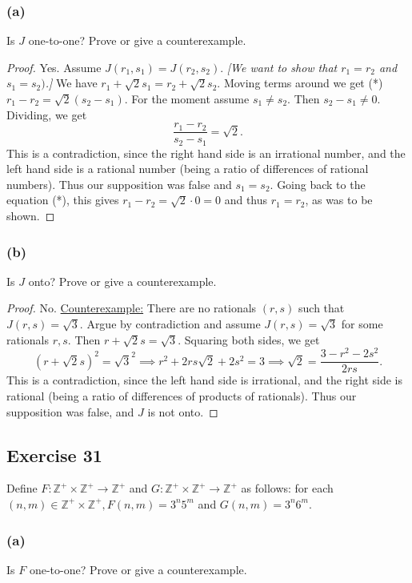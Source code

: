 \documentclass[14pt]{extarticle}
\newcommand{\Z}{\mathbb{Z}}
\begin{document}
\subsubsection{(a)}
Is $J$ one-to-one? Prove or give a counterexample.

\begin{proof}
    Yes. Assume \(J(r_1, s_1) = J(r_2, s_2)\). {\it [We want to show that \(r_1 = r_2\) and \(s_1 = s_2)\).]}
    We have \(r_1 + \sqrt{2}s_1 = r_2 + \sqrt{2}s_2\). Moving terms around we get (*) \(r_1-r_2=\sqrt{2}(s_2-s_1)\).
    For the moment assume \(s_1 \neq s_2\). Then \(s_2 - s_1 \neq 0\). Dividing, we get
    \[
        \frac{r_1 - r_2}{s_2 - s_1} = \sqrt{2}.
    \]
    This is a contradiction, since the right hand side is an irrational number, and the left hand side is a rational
    number (being a ratio of differences of rational numbers). Thus our supposition was false and \(s_1 = s_2\). Going
    back to the equation (*), this gives \(r_1-r_2=\sqrt{2} \cdot 0 = 0\) and thus \(r_1 = r_2\), as was to be shown.
\end{proof}

\subsubsection{(b)}
Is $J$ onto? Prove or give a counterexample.

\begin{proof}
    No. \underline{Counterexample:} There are no rationals $(r, s)$ such that \(J(r,s) = \sqrt{3}\). Argue by contradiction
    and assume \(J(r,s) = \sqrt{3}\) for some rationals $r,s$. Then \(r + \sqrt{2}s = \sqrt{3}\). Squaring both sides, we
    get
    \[
        (r + \sqrt{2}s)^2 = \sqrt{3}^2 \implies r^2 + 2rs\sqrt{2} + 2s^2 = 3 \implies \sqrt{2} = \frac{3 - r^2 - 2s^2}{2rs}.
    \]
    This is a contradiction, since the left hand side is irrational, and the right side is rational (being a ratio
    of differences of products of rationals). Thus our supposition was false, and $J$ is not onto.
\end{proof}

\subsection{Exercise 31}
Define \(F: \Z^+ \times \Z^+ \to \Z^+\) and \(G: \Z^+ \times \Z^+ \to \Z^+\) as follows: for each \((n, m) \in
\Z^+ \times \Z^+, F(n, m) = 3^n5^m\) and \(G(n, m) = 3^n6^m\).

\subsubsection{(a)}
Is $F$ one-to-one? Prove or give a counterexample.
\end{document}
